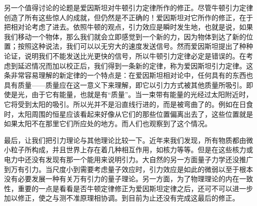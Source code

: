 另一个值得讨论的论题是爱因斯坦对牛顿引力定律所作的修正。尽管牛顿引力定律创造了所有这些惊人的成就，但仍然是不正确的！爱因斯坦对它所作的修正，在于把相对论考虑了进去。依照牛顿的观点，引力效应是瞬时发生地，也就是说，如果我们移动一个物体，那么我们就会立即感觉到一个新的力，因为物体到达了新的位置；按照这种说法，我们可以以无穷大的速度发送信号。然而爱因斯坦提出了种种论证，说明我们不能发送比光更快的信号，所以牛顿引力定律必定是错误的。在考虑到延迟情况而加以校正后，我们得到一条新的定律，称为爱因斯坦引力定律。这条非常容易理解的新定律的一个特点是：在爱因斯坦相对论中，任何具有的东西也具有质量——质量应在这一意义下来理解，即它以引力方式被其他质量所吸引。即使是光，由于它有能量，也就是有“质量”。当一束带有能量的光经过太阳附近时，它将受到太阳的吸引。所以光并不是沿直线行进的，而是被弯曲了的。例如在日食时，太阳周围的恒星应该看起来好像从它们的那些位置偏离出去了，这些位置就是如果太阳不在那里它们所应处的地方。而人们也观察到了这个情况。

最后，让我们把引力理论与其他理论比较一下。近年来我们发现，所有物质都由微小粒子所构成，并且世界上存在着几种相互作用，如核力等等。但是在这些核力或电力中还没有发现有那一个能用来说明引力。大自然的另一方面量子力学还没推广到万有引力。当尺度小到需要考虑量子效应时，引力效应是如此的微弱以至于根本没有必要发展一种有关万有引力的量子理论。另一方面，为了物理理论的内在一致性，重要的一点是看看是否牛顿定律修正为爱因斯坦定律之后，还可不可以进一步加以修正，使之与测不准原理相协调。到目前为止还没有完成这最后的修正。
